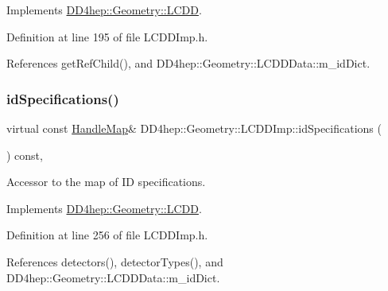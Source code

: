 Implements \hyperlink{class_d_d4hep_1_1_geometry_1_1_l_c_d_d_ac08b5db047061a7b08d8b78bd7cb5e72}{D\+D4hep\+::\+Geometry\+::\+L\+C\+DD}.



Definition at line 195 of file L\+C\+D\+D\+Imp.\+h.



References get\+Ref\+Child(), and D\+D4hep\+::\+Geometry\+::\+L\+C\+D\+D\+Data\+::m\+\_\+id\+Dict.

\hypertarget{class_d_d4hep_1_1_geometry_1_1_l_c_d_d_imp_ad552353b7983f13061f5373182893d16}{}\label{class_d_d4hep_1_1_geometry_1_1_l_c_d_d_imp_ad552353b7983f13061f5373182893d16} 
\subsubsection{\texorpdfstring{id\+Specifications()}{idSpecifications()}}
{\footnotesize\ttfamily virtual const \hyperlink{class_d_d4hep_1_1_geometry_1_1_l_c_d_d_a05cb11e7355772c7b0794bcca59bf477}{Handle\+Map}\& D\+D4hep\+::\+Geometry\+::\+L\+C\+D\+D\+Imp\+::id\+Specifications (\begin{DoxyParamCaption}{ }\end{DoxyParamCaption}) const\hspace{0.3cm}{\ttfamily [inline]}, {\ttfamily [virtual]}}



Accessor to the map of ID specifications. 



Implements \hyperlink{class_d_d4hep_1_1_geometry_1_1_l_c_d_d_a16ddadf18c24ad54b816354107338a80}{D\+D4hep\+::\+Geometry\+::\+L\+C\+DD}.



Definition at line 256 of file L\+C\+D\+D\+Imp.\+h.



References detectors(), detector\+Types(), and D\+D4hep\+::\+Geometry\+::\+L\+C\+D\+D\+Data\+::m\+\_\+id\+Dict.

\hypertarget{class_d_d4hep_1_1_geometry_1_1_l_c_d_d_imp_af1c734df7d03b3e7903e1c25c508d153}{}\label{class_d_d4hep_1_1_geometry_1_1_l_c_d_d_imp_af1c734df7d03b3e7903e1c25c508d153} 
